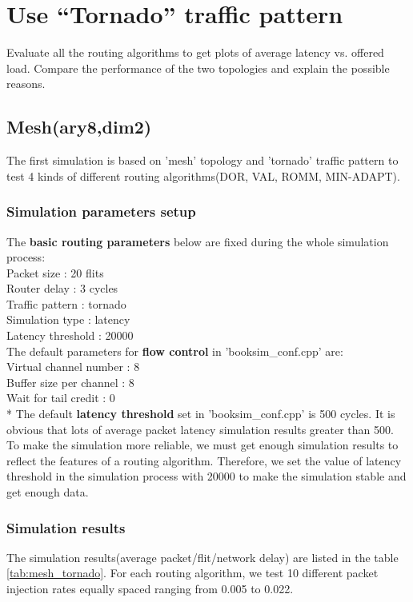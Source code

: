 \section{Use “Tornado” traffic pattern}

Evaluate all the routing algorithms to get plots of average latency vs. offered load. Compare the performance of the two topologies and explain the possible reasons.

\subsection{Mesh(ary8,dim2)}

The first simulation is based on 'mesh' topology and 'tornado' traffic pattern to test 4 kinds of different routing algorithms(DOR, VAL, ROMM, MIN-ADAPT).
\subsubsection{Simulation parameters setup}
The \textbf{basic routing parameters} below are fixed during the whole simulation process:\\
Packet size : 20 flits\\
Router delay : 3 cycles\\
Traffic pattern : tornado\\
Simulation type : latency\\
Latency threshold : 20000\\
The default parameters for \textbf{flow control} in 'booksim\_conf.cpp' are: \\
Virtual channel number : 8\\
Buffer size per channel : 8\\
Wait for tail credit : 0\\

* The default \textbf{latency threshold} set in 'booksim\_conf.cpp' is 500 cycles. It is obvious that lots of average packet latency simulation results greater than 500. To make the simulation more reliable, we must get enough simulation results to reflect the features of a routing algorithm. Therefore, we set the value of latency threshold in the simulation process with 20000 to make the simulation stable and get enough data.
\subsubsection{Simulation results}

The simulation results(average packet/flit/network delay) are listed in the table \ref{tab:mesh_tornado}. For each routing algorithm, we test 10 different packet injection rates equally spaced ranging from 0.005 to 0.022.


